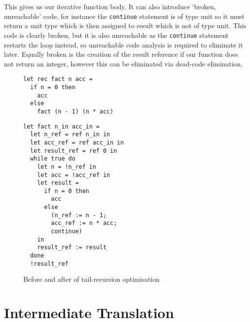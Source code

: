 \documentclass[12pt,twoside,notitlepage]{report}
\newcommand{\camlinline}{\texttt}
\newcommand\note[1]{\textcolor{blue}{#1}}
\begin{document}
This gives us our iterative function body. It can also introduce `broken, unreachable' code, for instance the \camlinline{continue} statement is of type unit so it must return a unit type which is then assigned to result which is not of type unit. This code is clearly broken, but it is also unreachable as the \camlinline{continue} statement restarts the loop instead, so unreachable code analysis is required to eliminate it later. Equally broken is the creation of the result reference if our function does not return an integer, however this can be eliminated via dead-code elimination.

\begin{figure}[h]
\begin{minipage}{0.5\linewidth}
	\begin{verbatim}
let rec fact n acc =
  if n = 0 then
    acc
  else
    fact (n - 1) (n * acc)
	\end{verbatim}
\end{minipage}
\begin{minipage}{0.5\linewidth}
\begin{verbatim}
let fact n_in acc_in =
  let n_ref = ref n_in in
  let acc_ref = ref acc_in in
  let result_ref = ref 0 in
  while true do
    let n = !n_ref in
    let acc = !acc_ref in
    let result =
      if n = 0 then
        acc
      else
        (n_ref := n - 1;
        acc_ref := n * acc;
        continue)
    in
    result_ref := result
  done
  !result_ref
\end{verbatim}
\end{minipage}
	\caption{Before and after of tail-recursion optimisation}
	\label{fig:tailrec}
\end{figure}





\section{Intermediate Translation}
\end{document}
